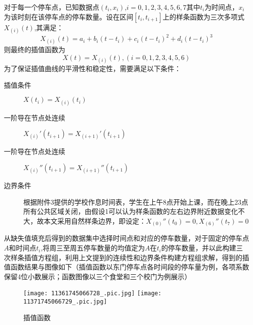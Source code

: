 \documentclass[withoutpreface,bwprint]{cumcmthesis}
\begin{document}
    对于每一个停车点，已知数据点$(t_i, x_i)$,$i = 0,1,2,3,4,5,6,7$其中$t_i$为时间点，$x_i$为该时刻在该停车点的停车数量。设在区间$[t_i, t_{i+1}]$上的样条函数为三次多项式$X_{(i)}(t)$,其满足：
\begin{equation}
    X_{(i)}(t) = a_i + b_i(t - t_i) + c_i(t - t_i)^2 + d_i(t - t_i)^3
\end{equation}
则最终的插值函数为
\begin{equation}
    X(t) = X_{(i)}(t),(i = 0,1,2,3,4,5,6)
\end{equation}
为了保证插值曲线的平滑性和稳定性，需要满足以下条件：
\begin{description}
    \item[插值条件] $X(t_i) = X_{(i)}(t_i) $
    \item[一阶导在节点处连续] $X_{(i)}'(t_{i+1}) = X_{(i+1)}'(t_{i+1})$
    \item[一阶导在节点处连续] $X_{(i)}''(t_{i+1}) = X_{(i+1)}''(t_{i+1})$
    \item[边界条件] 根据附件3提供的学校作息时间表，学生在上午8点开始上课，而在晚上23点所有公共区域关闭，由假设1可以认为样条函数的左右边界附近数据变化不大，故本文采用自然样条边界，即设定：$X_{(0)}''(t_0) = 0,X_{(6)}''(t_7) = 0$
\end{description}

从缺失值填充后得到的数据集中选择时间点和对应的停车数量，对于固定的停车点$A$和时间点$t_i$,将周三至周五停车数量的均值定为$A$在$t_i$的停车数量，并以此构建三次样条插值方程组，利用上文提到的连续性和边界条件构建方程组求解，得到的插值函数结果与图像如下（插值函数以东门停车点各时间段的停车量为例，各项系数保留4位小数展示；函数图像以三个食堂和三个校门为例展示）

\begin{figure}[ht]
\centering
{}
{\texttt{[image: 11361745066728\_.pic.jpg]}}
{\texttt{[image: 11371745066729\_.pic.jpg]}}
\caption{插值函数}\label{fig:插值函数}
\end{figure}
\end{document}
